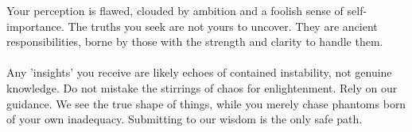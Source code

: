 \documentclass{article}
\begin{document}
\begin{infobox}
Your perception is flawed, clouded by ambition and a foolish sense of self-importance. The truths you seek are not yours to uncover. They are ancient responsibilities, borne by those with the strength and clarity to handle them. \\
\\
Any 'insights' you receive are likely echoes of contained instability, not genuine knowledge. Do not mistake the stirrings of chaos for enlightenment. Rely on our guidance. We see the true shape of things, while you merely chase phantoms born of your own inadequacy. Submitting to our wisdom is the only safe path.
\end{infobox}
\end{document}
